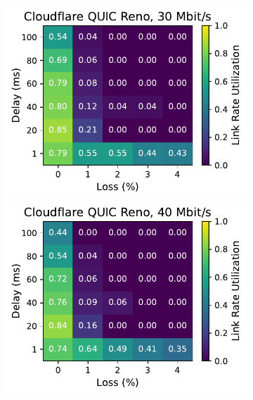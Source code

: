 \begin{figure}[ht]
\begin{subfigure}[b]{0.22\linewidth}
        \includegraphics[width=\linewidth,trim={0 0 2cm 0},clip]{splitting/figures/heatmaps/heatmap_quiche_reno_30mbps.pdf}
        \includegraphics[width=\linewidth,trim={0 0 2cm 0},clip]{splitting/figures/heatmaps/heatmap_quiche_reno_40mbps.pdf}

\end{subfigure}
\end{figure}
